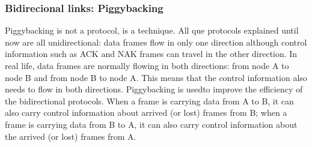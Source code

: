 \subsubsection{Bidirecional links: Piggybacking}
Piggybacking is not a protocol, is a technique. All que protocols explained until now are all unidirectional: data frames flow
in only one direction although control information such as ACK and NAK frames can
travel in the other direction. In real life, data frames are normally flowing in both directions:
from node A to node B and from node B to node A. This means that the control
information also needs to flow in both directions. Piggybacking is usedto improve the efficiency of the bidirectional protocols. When a frame is carrying
data from A to B, it can also carry control information about arrived (or lost) frames
from B; when a frame is carrying data from B to A, it can also carry control information
about the arrived (or lost) frames from A.
